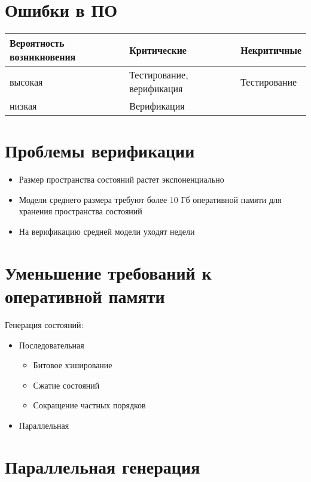 \documentclass[12pt]{article}
\begin{document}
\TitleSlide

\section{Ошибки в ПО}
\label{sec:sw-errors}

\begin{tabular}[ht]{|p{}|p{}|p{}|}
  \hline 
  Вероятность возникновения & Критические & Некритичные \\
  \hline
  высокая & Тестирование, верификация & Тестирование \\
  \hline
  низкая & Верификация & \\
  \hline
\end{tabular}

\section{Проблемы верификации}
\label{sec:verif-troubles}

\begin{itemize}
\item Размер пространства состояний растет экспоненциально

\item Модели среднего размера требуют более 10 Гб оперативной памяти для хранения пространства состояний

\item На верификацию средней модели уходят недели
\end{itemize}

\section{Уменьшение требований к оперативной памяти}
\label{sec:ram-lightening}

Генерация состояний:

\begin{itemize}
\item Последовательная
  \begin{itemize}
  \item Битовое хэширование
  \item Сжатие состояний
  \item Сокращение частных порядков
  \end{itemize}
\item Параллельная
\end{itemize}

\section{Параллельная генерация}
\label{sec:par-gen}
\end{document}
